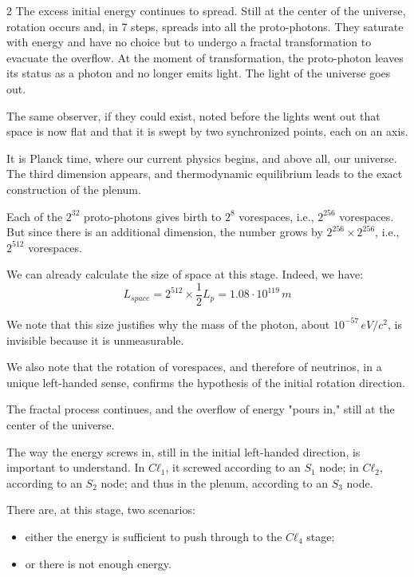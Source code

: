 \begin{multicols}{2}
	The excess initial energy continues to spread. Still at the center of the universe, rotation occurs and, in 7 steps, spreads into all the proto-photons. They saturate with energy and have no choice but to undergo a fractal transformation to evacuate the overflow. At the moment of transformation, the proto-photon leaves its status as a photon and no longer emits light. The light of the universe goes out.
	
	The same observer, if they could exist, noted before the lights went out that space is now flat and that it is swept by two synchronized points, each on an axis.
	
	It is Planck time, where our current physics begins, and above all, our universe. The third dimension appears, and thermodynamic equilibrium leads to the exact construction of the plenum.
	
	Each of the $2^{32}$ proto-photons gives birth to $2^8$ vorespaces, i.e., $2^{256}$ vorespaces. But since there is an additional dimension, the number grows by $2^{256} \times 2^{256}$, i.e., $2^{512}$ vorespaces.
	
	We can already calculate the size of space at this stage. Indeed, we have:
	\begin{equation*}
		L_{space} = 2^{512} \times \frac{1}{2} L_p = 1.08 \cdot 10^{119}\,m
	\end{equation*}
	
	We note that this size justifies why the mass of the photon, about $10^{-57}\,eV/c^2$, is invisible because it is unmeasurable.
	
	We also note that the rotation of vorespaces, and therefore of neutrinos, in a unique left-handed sense, confirms the hypothesis of the initial rotation direction.
	
	The fractal process continues, and the overflow of energy "pours in," still at the center of the universe.
	
	The way the energy screws in, still in the initial left-handed direction, is important to understand. In $Cℓ_1$, it screwed according to an $S_1$ node; in $Cℓ_2$, according to an $S_2$ node; and thus in the plenum, according to an $S_3$ node.
	\medskip
	
	There are, at this stage, two scenarios:
	\begin{itemize}
		\item either the energy is sufficient to push through to the $Cℓ_4$ stage;
		\item or there is not enough energy.
	\end{itemize}
	

\end{multicols}
